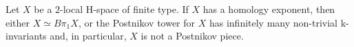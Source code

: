 Let $X$ be a $2$-local H-space of finite type. If $X$ has a homology exponent, then either $X\simeq B\pi_1X$, or  the Postnikov tower for $X$ has infinitely many non-trivial k-invariants and, in particular, $X$ is not a Postnikov piece.
\endinput